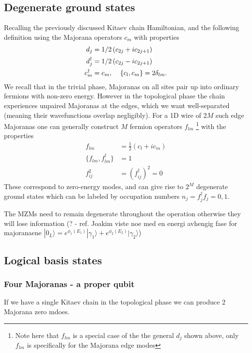 \subsection{Degenerate ground states} \label{subsec:Degenerate_ground_states}
Recalling the previously discussed Kitaev chain Hamiltonian, and the following definition using the Majorana operators $c_{m}$ with properties 
\begin{align}
    d_j &= \frac{1}{2} \left(c_{2j} + i c_{2j+1} \right) \\
    d_j^\dagger &= \frac{1}{2} \left(c_{2j} - i c_{2j+1} \right)\\
    c_{m}^\dagger &= c_m, \hspace{4mm} \{c_l, c_m\} = 2\delta_{lm}.
\end{align}
We recall that in the trivial phase, Majoranas on all sites pair up into ordinary fermions with non-zero energy. However in the topological phase the chain experiences unpaired Majoranas at the edges, which we want well-separated (meaning their wavefunctions overlap negligibly). For a 1D wire of $2M$ such edge Majoranas one can generally construct $M$ fermion operators $f_{lm}$ \footnote{Note here that $f_{lm}$ is a special case of the the general $d_j$ shown above, only $f_{lm}$ is specifically for the Majorana edge modes} with the properties
\begin{align}
    f_{lm} &= \frac{1}{2} \left(c_{l} + i c_{m} \right) \\
    \{f_{lm}, f^\dagger_{lm}\} &= 1 \\
    f_{ij}^2 &= \left(f_{ij}^\dagger\right)^2 = 0
\end{align}
These correspond to zero-energy modes, and can give rise to $2^M$ degenerate ground states which can be labeled by occupation numbers $n_j = f_j^\dagger f_j = 0, 1$. 

The MZMs need to remain degenerate throughout the operation otherwise they will lose information
(? - ref. Joakim viste noe med en energi avhengig fase for majoranaene $|0_L\rangle = e^{\phi_1(E_1)}|\gamma_1\rangle + e^{\phi_2(E_2)}|\gamma_2\rangle $) 

\subsection{Logical basis states}
\subsubsection{Four Majoranas - a proper qubit}
If we have a single Kitaev chain in the topological phase we can produce 2 Majorana zero mdoes. 

